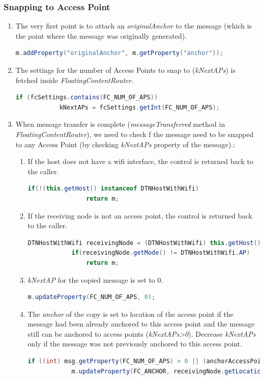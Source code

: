 \subsubsection{Snapping to Access Point}
\begin{enumerate}
	\item The very first point is to attach an \textit{originalAnchor} to the message (which is the point where the message was originally generated).
	\begin{lstlisting}[language=java]
	m.addProperty("originalAnchor", m.getProperty("anchor"));
	\end{lstlisting}
	\item The settings for the number of Access Points to snap to (\textit{kNextAPs}) is fetched inside \textit{FloatingContentRouter}.
	\begin{lstlisting}[language=java]
		if (fcSettings.contains(FC_NUM_OF_APS))
			kNextAPs = fcSettings.getInt(FC_NUM_OF_APS);
	\end{lstlisting}
	\item When message transfer is complete (\textit{messageTransferred} method in \textit{FloatingContentRouter}), we need to check f the message need to be snapped to any Access Point (by checking \textit{kNextAPs} property of the message).:
	\begin{enumerate}
		\item If the host does not have a wifi interface, the control is returned back to the caller.
		\begin{lstlisting}[language=java]
			if(!(this.getHost() instanceof DTNHostWithWifi)
				return m;
			\end{lstlisting}
		\item If the receiving node is not an access point, the control is returned back to the caller.
		\begin{lstlisting}[language=java]
			DTNHostWithWifi receivingNode = (DTNHostWithWifi) this.getHost();
			if(receivingNode.getMode() != DTNHostWithWifi.AP)
				return m;
		\end{lstlisting}

		\item \textit{kNextAP} for the copied message is set to 0.
		\begin{lstlisting}[language=java]
			m.updateProperty(FC_NUM_OF_APS, 0);
		\end{lstlisting}

		\item The \textit{anchor} of the copy is set to location of the access point if the message had been already anchored to this access point and the message still can be anchored to access points (\textit{kNextAPs>0}). Decrease \textit{kNextAPs} only if the message was not previously anchored to this access point.
		\begin{lstlisting}[language=java]
		if ((int) msg.getProperty(FC_NUM_OF_APS) > 0 || (anchorAccessPoints != null && anchorAccessPoints.contains(receivingNode.toString()))) {
			m.updateProperty(FC_ANCHOR, receivingNode.getLocation().clone());


\end{lstlisting}
\end{enumerate}
\end{enumerate}
